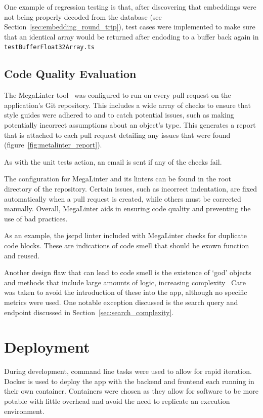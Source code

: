 One example of regression testing is that, after discovering that embeddings were
not being properly decoded from the database (see Section~\ref{sec:embedding_round_trip}),
test cases were implemented to make sure that an identical array would be returned
after endoding to a buffer back again in \texttt{testBufferFloat32Array.ts}

\subsection{Code Quality Evaluation}
The MegaLinter tool~\cite{vuillamy_megalinter_nodate} was configured to run on every pull request on the application's Git repository. This includes a wide array
of checks to ensure that style guides were adhered to and to catch potential issues, such as making potentially incorrect
assumptions about an object's type. This generates a report that is attached to each pull request detailing
any issues that were found (figure~\ref{fig:metalinter_report}).

As with the unit tests action, an email is sent if any of the checks fail.

The configuration for MegaLinter and its linters can be found in the root directory of the repository.
Certain issues, such as incorrect indentation, are fixed automatically when a pull request is created, while others
must be corrected manually. Overall, MegaLinter aids in ensuring code quality and preventing the use of bad practices.

As an example, the jscpd linter included with MegaLinter checks for duplicate code blocks. These are indications of code
smell that should be exown function and reused.~\cite{fowler_refactoring_1997}

Another design flaw that can lead to code smell is the existence of \enquote*{god} objects
and methods that include large amounts of logic, increasing complexity~\cite{marinescu_measurement_2005,vaucher_tracking_2009}
Care was taken to avoid the introduction of these into the \chef{} app, although no specific
metrics were used. One notable exception discussed is the search query and endpoint discussed in
Section~\ref{sec:search_complexity}.

\section{Deployment}

During development, command line tasks were used to allow for rapid iteration. Docker is used to deploy
the app with the backend and frontend each running in their own container. Containers were chosen as they
allow for software to be more potable with little overhead and avoid the need to replicate an execution
environment.~\cite{bernstein_containers_2014,vase_advantages_2015}

